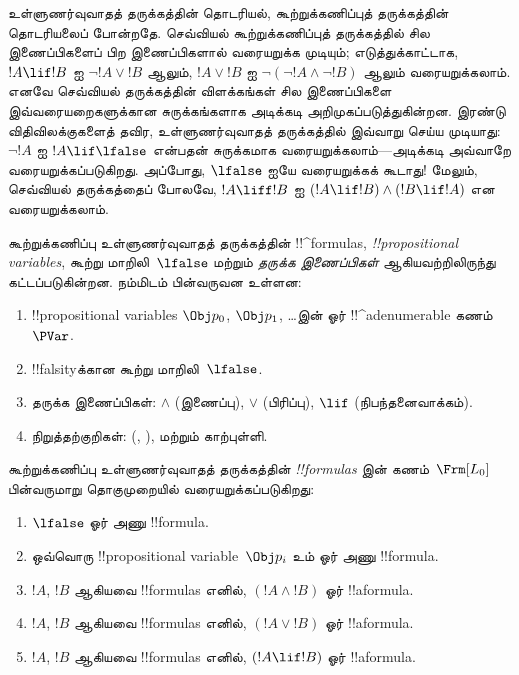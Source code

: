 \documentclass[../../../include/open-logic-section]{subfiles}
\begin{document}


உள்ளுணர்வுவாதத் தருக்கத்தின் தொடரியல், கூற்றுக்கணிப்புத் தருக்கத்தின்
தொடரியலைப் போன்றதே. செவ்வியல் கூற்றுக்கணிப்புத் தருக்கத்தில் சில
இணைப்பிகளைப் பிற இணைப்பிகளால் வரையறுக்க முடியும்; எடுத்துக்காட்டாக,
$!A \lif !B$ ஐ $\lnot !A \lor !B$ ஆலும், $!A \lor !B$ ஐ
$\lnot(\lnot !A \land \lnot !B)$ ஆலும் வரையறுக்கலாம். எனவே செவ்வியல்
தருக்கத்தின் விளக்கங்கள் சில இணைப்பிகளை இவ்வரையறைகளுக்கான சுருக்கங்களாக
அடிக்கடி அறிமுகப்படுத்துகின்றன. இரண்டு விதிவிலக்குகளைத் தவிர,
உள்ளுணர்வுவாதத் தருக்கத்தில் இவ்வாறு செய்ய முடியாது: $\lnot !A$ ஐ
$!A \lif \lfalse$ என்பதன் சுருக்கமாக வரையறுக்கலாம்---அடிக்கடி அவ்வாறே
வரையறுக்கப்படுகிறது. அப்போது, $\lfalse$ ஐயே வரையறுக்கக் கூடாது!{} மேலும்,
செவ்வியல் தருக்கத்தைப் போலவே, $!A \liff !B$ ஐ $(!A \lif !B) \land
(!B \lif !A)$ என வரையறுக்கலாம்.

கூற்றுக்கணிப்பு உள்ளுணர்வுவாதத் தருக்கத்தின் !!^{formula}s,
\emph{!!{propositional variable}s}, கூற்று மாறிலி~$\lfalse$ மற்றும்
\emph{தருக்க இணைப்பிகள்} ஆகியவற்றிலிருந்து கட்டப்படுகின்றன. நம்மிடம்
பின்வருவன உள்ளன:

\begin{enumerate}
\item !!{propositional variable}s $\Obj p_0$, $\Obj p_1$, \dots இன்
  ஓர் !!^a{denumerable} கணம்~$\PVar$.
\item !!{falsity}க்கான கூற்று மாறிலி~$\lfalse$.
\item தருக்க இணைப்பிகள்: $\land$ (இணைப்பு), $\lor$ (பிரிப்பு), $\lif$
  (நிபந்தனைவாக்கம்).
\item நிறுத்தற்குறிகள்: (, ), மற்றும் காற்புள்ளி.
\end{enumerate}

\begin{defn}[வாய்பாடு]
 கூற்றுக்கணிப்பு உள்ளுணர்வுவாதத் தருக்கத்தின்
\emph{!!{formula}s} இன் கணம்~$\Frm[L_0]$ பின்வருமாறு தொகுமுறையில்
வரையறுக்கப்படுகிறது:
\begin{enumerate}
\item $\lfalse$ ஓர் அணு !!{formula}.

\item ஒவ்வொரு !!{propositional variable}~$\Obj p_i$ உம் ஓர் அணு
  !!{formula}.

\item $!A$, $!B$ ஆகியவை !!{formula}s எனில், $(!A \land !B)$ ஓர்
  !!a{formula}.

\item $!A$, $!B$ ஆகியவை !!{formula}s எனில், $(!A \lor !B)$ ஓர்
  !!a{formula}.

\item $!A$, $!B$ ஆகியவை !!{formula}s எனில், $(!A \lif !B)$ ஓர்
  !!a{formula}.

\end{enumerate}
\end{defn}
\end{document}
